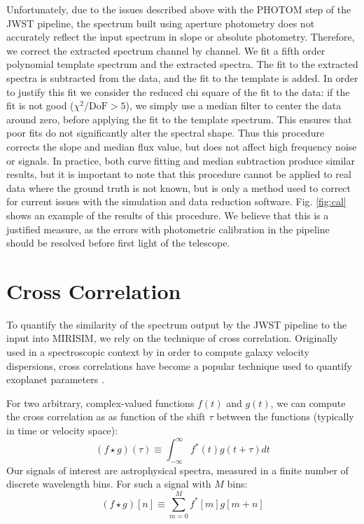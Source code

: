 Unfortunately, due to the issues described above with the PHOTOM step of the JWST pipeline, the spectrum built using aperture photometry does not accurately reflect the input spectrum in slope or absolute photometry. 
Therefore, we correct the extracted spectrum channel by channel. 
We fit a fifth order polynomial template spectrum and the extracted spectra.
The fit to the extracted spectra is subtracted from the data, and the fit to the template is added. 
In order to justify this fit we consider the reduced chi square of the fit to the data: if the fit is not good ($\chi^{2}/\mathrm{DoF} > 5$), we simply use a median filter to center the data around zero, before applying the fit to the template spectrum.
This ensures that poor fits do not significantly alter the spectral shape. 
Thus this procedure corrects the slope and median flux value, but does not affect high frequency noise or signals.
In practice, both curve fitting and median subtraction produce similar results, but it is important to note that this procedure cannot be applied to real data where the ground truth is not known, but is only a method used to correct for current issues with the simulation and data reduction software.
Fig. \ref{fig:cal} shows an example of the results of this procedure. 
We believe that this is a justified measure, as the errors with photometric calibration in the pipeline should be resolved before first light of the telescope.

\section{Cross Correlation}\label{sec:cc}
To quantify the similarity of the spectrum output by the JWST pipeline to the input into MIRISIM, we rely on the technique of cross correlation.
Originally used in a spectroscopic context by \parencite{Simkin1974} in order to compute galaxy velocity dispersions, cross correlations have become a popular technique used to quantify exoplanet parameters \parencite{Snellen2014}.

For two arbitrary, complex-valued functions $f(t)$ and $g(t)$, we can compute the cross correlation as as function of the shift $\tau$ between the functions (typically in time or velocity space):
\begin{equation}\label{eqn:crosscorr}
\left(f \star g\right)(\tau) \equiv \int_{-\infty}^{\infty}f^{*}(t)g(t + \tau)dt
\end{equation}
Our signals of interest are astrophysical spectra, measured in a finite number of discrete wavelength bins. For such a signal with $M$ bins:
\begin{equation}\label{eqn:discretecorr}
\left(f \star g\right)[n] \equiv \sum_{m=0}^{M}f^{*}[m]g[m + n]
\end{equation}

